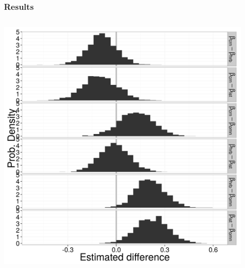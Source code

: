\documentclass{beamer}
\begin{document}
\begin{frame}
  \frametitle{Results}
  \begin{columns}
    \begin{column}{0.5\textwidth}
      \includegraphics[width=\textwidth,height=0.8\textheight,keepaspectratio=true]{figure/diet_diff_est}
    \end{column}
    \begin{column}{0.5\textwidth}

\end{column}
\end{columns}
\end{frame}
\end{document}
